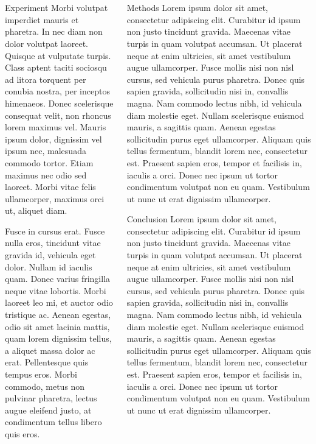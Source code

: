 \documentclass[12pt]{beamer}
\renewcommand{\maketitle}{%
	\begin{center}%
		\Huge\inserttitle\\[5mm]%
		\Large\insertauthor\\[5mm]%
		\Large\insertinstitute%
	\end{center}%
	\vspace*{-1ex}%
}
\begin{document}
\begin{frame}{\maketitle}
\begin{columns}
\begin{column}{.45\textwidth}
\begin{block}{Experiment}
					Morbi volutpat imperdiet mauris et pharetra. In nec diam non dolor volutpat laoreet. Quisque at vulputate turpis. Class aptent taciti sociosqu ad litora torquent per conubia nostra, per inceptos himenaeos. Donec scelerisque consequat velit, non rhoncus lorem maximus vel. Mauris ipsum dolor, dignissim vel ipsum nec, malesuada commodo tortor. Etiam maximus nec odio sed laoreet. Morbi vitae felis ullamcorper, maximus orci ut, aliquet diam.

					Fusce in cursus erat. Fusce nulla eros, tincidunt vitae gravida id, vehicula eget dolor. Nullam id iaculis quam. Donec varius fringilla neque vitae lobortis. Morbi laoreet leo mi, et auctor odio tristique ac. Aenean egestas, odio sit amet lacinia mattis, quam lorem dignissim tellus, a aliquet massa dolor ac erat. Pellentesque quis tempus eros. Morbi commodo, metus non pulvinar pharetra, lectus augue eleifend justo, at condimentum tellus libero quis eros.
				\end{block}
			\end{column}
			\begin{column}{.45\textwidth}
				\begin{block}{Methods}
					Lorem ipsum dolor sit amet, consectetur adipiscing elit. Curabitur id ipsum non justo tincidunt gravida. Maecenas vitae turpis in quam volutpat accumsan. Ut placerat neque at enim ultricies, sit amet vestibulum augue ullamcorper. Fusce mollis nisi non nisl cursus, sed vehicula purus pharetra. Donec quis sapien gravida, sollicitudin nisi in, convallis magna. Nam commodo lectus nibh, id vehicula diam molestie eget. Nullam scelerisque euismod mauris, a sagittis quam. Aenean egestas sollicitudin purus eget ullamcorper. Aliquam quis tellus fermentum, blandit lorem nec, consectetur est. Praesent sapien eros, tempor et facilisis in, iaculis a orci. Donec nec ipsum ut tortor condimentum volutpat non eu quam. Vestibulum ut nunc ut erat dignissim ullamcorper.
				\end{block}
				\vspace{1em}
				\begin{exampleblock}{Conclusion}
					Lorem ipsum dolor sit amet, consectetur adipiscing elit. Curabitur id ipsum non justo tincidunt gravida. Maecenas vitae turpis in quam volutpat accumsan. Ut placerat neque at enim ultricies, sit amet vestibulum augue ullamcorper. Fusce mollis nisi non nisl cursus, sed vehicula purus pharetra. Donec quis sapien gravida, sollicitudin nisi in, convallis magna. Nam commodo lectus nibh, id vehicula diam molestie eget. Nullam scelerisque euismod mauris, a sagittis quam. Aenean egestas sollicitudin purus eget ullamcorper. Aliquam quis tellus fermentum, blandit lorem nec, consectetur est. Praesent sapien eros, tempor et facilisis in, iaculis a orci. Donec nec ipsum ut tortor condimentum volutpat non eu quam. Vestibulum ut nunc ut erat dignissim ullamcorper.

\end{exampleblock}
\end{column}
\end{columns}
\end{frame}
\end{document}
